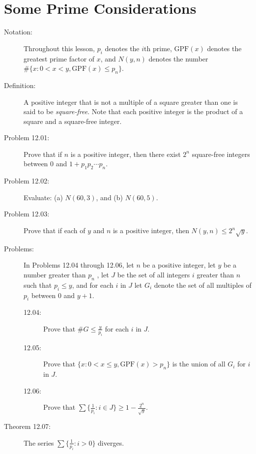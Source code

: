 \documentclass{article}
\begin{document}
\section{Some Prime Considerations}

\begin{description}

  \item[Notation:] Throughout this lesson, $p_i$ denotes the $i$th prime, $\text{GPF}(x)$ denotes the greatest prime factor of $x$, and $N(y,n)$ denotes the number $\# \{ x: 0<x<y, \text{GPF}(x) \leq p_n \}$.

  \item[Definition:] A positive integer that is not a multiple of a square greater than one is said to be \emph{square-free}. Note that each positive integer is the product of a square and a square-free integer.

  \item[Problem 12.01:] Prove that if $n$ is a positive integer, then there exist $2^n$ square-free integers between $0$ and $1+p_1 p_2 \cdots p_n$.

  \item[Problem 12.02:] Evaluate: (a) $N(60,3)$, and (b) $N(60,5)$.

  \item[Problem 12.03:] Prove that if each of $y$ and $n$ is a positive integer, then $N(y,n) \leq 2^n\sqrt{y}$.

  \item[Problems:] In Problems 12.04 through 12.06, let $n$ be a positive integer, let $y$ be a number greater than $p_n$ , let $J$ be the set of all integers $i$ greater than $n$ such that $p_i \leq y$, and for each $i$ in $J$ let $G_i$ denote the set of all multiples of $p_i$ between $0$ and $y+1$.
    \begin{description}
      \item[12.04:] Prove that $\# G \leq \frac{y}{p_i}$ for each $i$ in $J$.
      \item[12.05:] Prove that $\{ x: 0 < x \leq y, \text{GPF}(x) > p_n \}$ is the union of all $G_i$ for $i$ in $J$.
      \item[12.06:] Prove that $\sum \{ \frac{1}{p_i}: i \in J \} \geq 1- \frac{2^n}{\sqrt{y}}$.
    \end{description}

  \item[Theorem 12.07:] The series $\sum \{ \frac{1}{p_i}: i>0 \}$ diverges.


\end{description}
\end{document}
